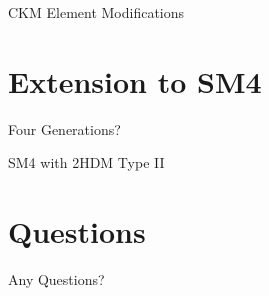 \documentclass[10pt,xcolor={table,dvipsnames},t]{beamer}
\begin{document}
\begin{frame}{CKM Element Modifications}

\end{frame}

\section{Extension to SM4}
\begin{frame}{Four Generations?}

\end{frame}

\begin{frame}{SM4 with 2HDM Type II}

\end{frame}

\section{Questions}
\begin{frame}
    \begin{center}
        \vspace{60pt}
        \Huge Any Questions?
    \end{center}
\end{frame}
\end{document}
